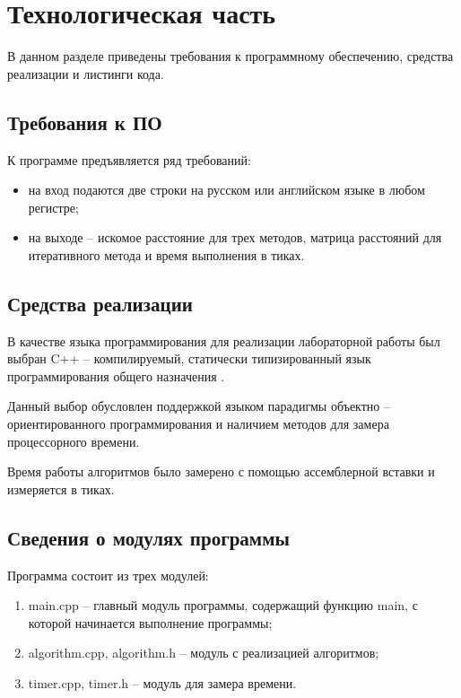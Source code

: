 \chapter{Технологическая часть}

В данном разделе приведены требования к программному обеспечению, средства реализации и листинги кода.

\section{Требования к ПО}

К программе предъявляется ряд требований:
\begin{itemize}
	\item на вход подаются две строки на русском или английском языке в любом регистре;
	\item на выходе -- искомое расстояние для трех методов, матрица расстояний для итеративного метода и время выполнения в тиках.
\end{itemize}

\section{Средства реализации}

В качестве языка программирования для реализации лабораторной работы был выбран C++ -- компилируемый, статически типизированный язык программирования общего назначения \cite{cpp}. 

Данный выбор обусловлен поддержкой языком парадигмы объектно -- ориентированного программирования и наличием методов для замера процессорного времени.

Время работы алгоритмов было замерено с помощью ассемблерной вставки и измеряется в тиках.

\section{Сведения о модулях программы}
Программа состоит из трех модулей:
\begin{enumerate}[label={\arabic*)}]
	\item main.cpp -- главный модуль программы, содержащий функцию main, с которой начинается выполнение программы;
	\item algorithm.cpp, algorithm.h -- модуль с реализацией алгоритмов;
	\item timer.cpp, timer.h -- модуль для замера времени.
\end{enumerate}

